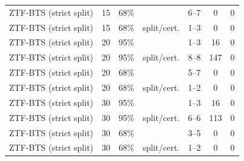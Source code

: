 \begin{longtable}{llllccc}
ZTF-BTS (strict split) & 15 & 68\% & \gamut{} & 6--7 & 0 & 0 \\
ZTF-BTS (strict split) & 15 & 68\% & split/cert. & 1--3 & 0 & 0 \\
ZTF-BTS (strict split) & 20 & 95\% & \gamut{} & 1--3 & 16 & 0 \\
ZTF-BTS (strict split) & 20 & 95\% & split/cert. & 8--8 & 147 & 0 \\
ZTF-BTS (strict split) & 20 & 68\% & \gamut{} & 5--7 & 0 & 0 \\
ZTF-BTS (strict split) & 20 & 68\% & split/cert. & 1--2 & 0 & 0 \\
ZTF-BTS (strict split) & 30 & 95\% & \gamut{} & 1--3 & 16 & 0 \\
ZTF-BTS (strict split) & 30 & 95\% & split/cert. & 6--6 & 113 & 0 \\
ZTF-BTS (strict split) & 30 & 68\% & \gamut{} & 3--5 & 0 & 0 \\
ZTF-BTS (strict split) & 30 & 68\% & split/cert. & 1--2 & 0 & 0 \\
\bottomrule
\end{longtable}
\par\endgroup

